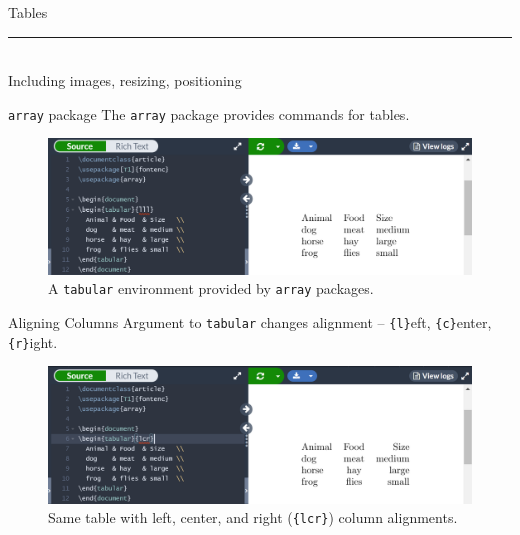 \documentclass{beamer}
\begin{document}
{  \begin{frame}[plain]
    \vfill
    \centering
    \begin{beamercolorbox}[sep=8pt,center,shadow=true,rounded=true]{Tables}
      \insertsectionhead\par%
      \color{davisblue}\noindent\rule{10cm}{1pt} \\
      \footnotesize{Including images, resizing, positioning}
    \end{beamercolorbox}
    \vfill
  \end{frame}

  \begin{frame}{\texttt{array} package}
    The \texttt{array} package provides commands for tables.
    \begin{figure}
      \includegraphics[width=0.9\linewidth]{day01-overleaf-11A-table.png}
      \caption{A \texttt{tabular} environment provided by \texttt{array} packages.}
      \label{fig:day01-overleaf-11A}
    \end{figure}
  \end{frame}

  \begin{frame}{Aligning Columns}
    Argument to \texttt{tabular} changes alignment -- \texttt{\{l\}}eft, \texttt{\{c\}}enter, \texttt{\{r\}}ight.
    \begin{figure}
      \includegraphics[width=0.9\linewidth]{day01-overleaf-11B-table-align.png}
      \caption{Same table with left, center, and right (\texttt{\{lcr\}}) column alignments.}
      \label{fig:day01-overleaf-11B}
    \end{figure}
  \end{frame}

}
\end{document}
